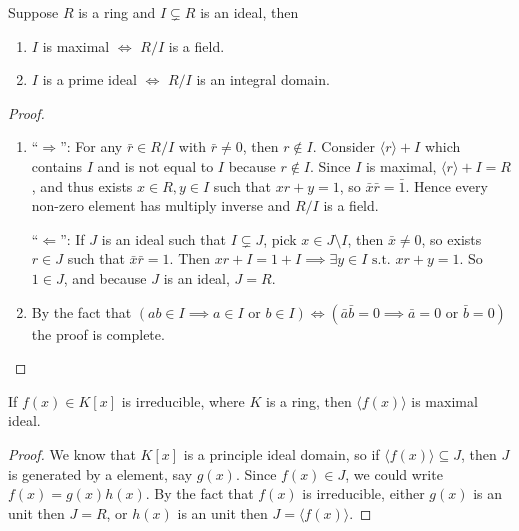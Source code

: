 \begin{prop} \label{prop:max-prime-to-field-int-domain}
  Suppose $R$ is a ring and $I \subsetneq R$ is an ideal, then
  \begin{enumerate}
    \item $I$ is maximal $\iff$ $R / I$ is a field.
    \item $I$ is a prime ideal $\iff$ $R / I$ is an integral domain.
  \end{enumerate}

  \begin{proof} \hfill
    \begin{enumerate}
      \item ``$\Rightarrow$'': For any $\bar{r} \in R/I$ with $\bar{r} \neq 0$, then $r \not\in I$.
        Consider $\langle r \rangle + I$ which contains $I$ and is not equal to $I$ because $r \not\in I$.
        Since $I$ is maximal, $\langle r \rangle + I = R$, and thus exists $x \in R, y \in I$ such that
        $xr + y = 1$, so $\bar{x} \bar{r} = \bar{1}$. Hence every non-zero element has multiply inverse
        and $R / I$ is a field.

      ``$\Leftarrow$'': If $J$ is an ideal such that $I \subsetneq J$, pick $x \in J \setminus I$,
      then $\bar{x} \neq 0$, so exists $r \in J$ such that $\bar{x} \bar{r} = 1$. Then
      $xr + I = 1 + I \implies \exists y \in I \text{ s.t. } xr + y = 1$. So $1 \in J$, and
      because $J$ is an ideal, $J = R$.

      \item By the fact that $(ab \in I \implies a \in I \text{ or } b \in I) \iff
        (\bar{a}\bar{b} = 0 \implies \bar{a} = 0 \text{ or } \bar{b} = 0)$ the proof is complete.
    \end{enumerate}
  \end{proof}
\end{prop}

\begin{prop} \label{prop:irr-to-max-ideal}
  If $f(x) \in K[x]$ is irreducible, where $K$ is a ring, then $\langle f(x) \rangle$ is maximal ideal.
  \begin{proof}
    We know that $K[x]$ is a principle ideal domain, so if $\langle f(x) \rangle \subseteq J$, then
    $J$ is generated by a element, say $g(x)$. Since $f(x) \in J$, we could write $f(x) = g(x) h(x)$.
    By the fact that $f(x)$ is irreducible, either $g(x)$ is an unit then $J = R$, or $h(x)$ is
    an unit then $J = \langle f(x) \rangle$.
  \end{proof}
\end{prop}

